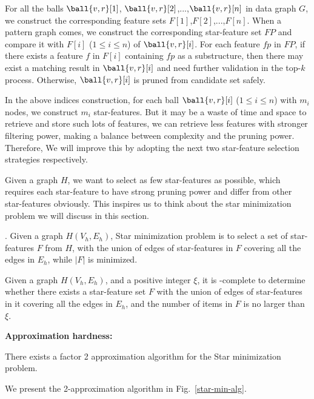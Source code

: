 For all the balls $\ball{v, r}[1]$, $\ball{v, r}[2]$,...,$\ball{v, r}[n]$ in data graph $G$, we construct the corresponding feature sets $F[1]$,$F[2]$,...,$F[n]$. When a pattern graph comes, we construct the corresponding star-feature set $FP$ and compare it with $F[i]$ ($1\leq i\leq n$) of $\ball{v, r}[i]$. For each feature $fp$ in $FP$, if there exists a feature $f$ in $F[i]$ containing $fp$ as a substructure, then there may exist a matching result in $\ball{v, r}[i]$ and need further validation in the top-$k$ process. Otherwise, $\ball{v, r}[i]$ is pruned from candidate set safely.

In the above indices construction, for each ball $\ball{v, r}[i]$ ($1\leq i\leq n$) with $m_i$ nodes, we construct $m_i$ star-features. But it may be a waste of time and space to retrieve and store such lots of features, we can retrieve less features with stronger filtering power, making a balance between complexity and the pruning power. Therefore, We will improve this by adopting the next two star-feature selection strategies respectively.

Given a graph $H$, we want to select as few star-features as possible, which requires each star-feature to have strong pruning power and differ from other star-features obviously. This inspires us to think about the star minimization problem we will discuss in this section.

. Given a graph $H(V_h, E_h)$, Star minimization problem is to select a set of star-features $F$ from $H$, with the union of edges of star-features in $F$ covering all the edges in $E_h$, while $|F|$ is minimized.

\begin{theorem}
\label{thm-star-mini-complexity}
Given a graph $H(V_h, E_h)$, and a positive integer $\xi$, it is \NP-complete to determine whether there exists a star-feature set $F$ with the union of edges of star-features in it covering all the edges in $E_h$, and the number of items in $F$ is no larger than $\xi$.
\end{theorem}

\textbf{Approximation hardness:}

\begin{theorem}
\label{thm-star-mini-complexity}
There exists a factor 2 approximation algorithm for the Star minimization problem.
\end{theorem}

We present the 2-approximation algorithm in Fig.~\ref{star-min-alg}.

